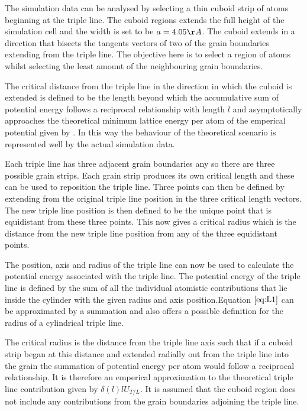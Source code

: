 \documentclass[12pt,a4paper]{book}
\begin{document}
The simulation data can be analysed by selecting a thin cuboid strip of atoms beginning at the triple line. The cuboid regions extends the full height of the simulation cell and the width is set to be $a =4.05 \AA$. The cuboid extends in a direction that bisects the tangents vectors of two of the grain boundaries extending from the triple line. The objective here is to select a region of atoms whilst selecting the least amount of the neighbouring grain boundaries. 

The critical distance from the triple line in the direction in which the cuboid is extended is defined to be the length beyond which the accumulative sum of potential energy follows a reciprocal relationship with length $l$ and asymptotically approaches the theoretical minimum lattice energy per atom of the emperical potential given by \cite{Zope2003}. In this way the behaviour of the theoretical scenario is represented well by the actual simulation data.

Each triple line has three adjacent grain boundaries any so there are three possible grain strips. Each grain strip produces its own critical length and these can be used to reposition the triple line. Three points can then be defined by extending from the original triple line position in the three critical length vectors. The new triple line position is then defined to be the unique point that is equidistant from these three points. This now gives a critical radius which is the distance from the new triple line position from any of the three equidistant points.

The position, axis and radius of the triple line can now be used to calculate the potential energy associated with the triple line. The potential energy of the triple line is defined by the sum of all the individual atomistic contributions that lie inside the cylinder with the given radius and axis position.Equation $\ref{eq:L1}$ can be approximated by a summation and also offers a possible definition for the radius of a cylindrical triple line.

The critical radius is the distance from the triple line axis such that if a cuboid strip began at this distance and extended radially out from the triple line into the grain the summation of potential energy per atom would follow a reciprocal relationship.   It is therefore an emperical approximation to the theoretical triple line contribution given by $\delta(l) l U_{T/L}$. It is assumed that the cuboid region does not include any contributions from the grain boundaries adjoining the triple line.
\end{document}
